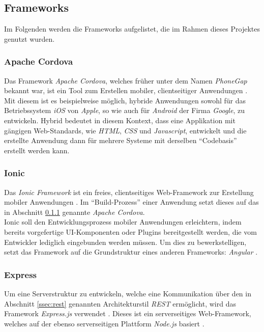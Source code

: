 \documentclass[a4paper, 11pt, DIV=11, listof=numbered, numbers=noenddot]{scrartcl}
\begin{document}
	\subsection{Frameworks}
	Im Folgenden werden die Frameworks aufgelistet, die im Rahmen dieses Projektes genutzt wurden.

	\subsubsection{Apache Cordova}\label{sssec:cordova}
	Das Framework \textit{Apache Cordova}, welches früher unter dem Namen \textit{PhoneGap} bekannt war, ist ein Tool zum Erstellen mobiler, clientseitiger Anwendungen \cite{@Cordova}.
	Mit diesem ist es beispielweise möglich, hybride Anwendungen sowohl für das Betriebssystem \textit{iOS} von \textit{Apple}, so wie auch für \textit{Android} der Firma \textit{Google}, zu entwickeln.
	Hybrid bedeutet in diesem Kontext, dass eine Applikation mit gängigen Web-Standards, wie \textit{HTML}, \textit{CSS} und \textit{Javascript}, entwickelt und die erstellte Anwendung dann für mehrere Systeme mit derselben \enquote{Codebasis} erstellt werden kann.

	\subsubsection{Ionic}\label{sssec:ionic}
	Das \textit{Ionic Framework} ist ein freies, clientseitiges Web-Framework zur Erstellung mobiler Anwendungen \cite{@Ionic}.
	Im \enquote{Build-Prozess} einer Anwendung setzt dieses auf das in Abschnitt \ref{sssec:cordova} genannte \textit{Apache Cordova}.\\
	Ionic soll den Entwicklungsprozess mobiler Anwendungen erleichtern, indem bereits vorgefertige UI-Komponenten oder Plugins bereitgestellt werden, die vom Entwickler lediglich eingebunden werden müssen.
	Um dies zu bewerkstelligen, setzt das Framework auf die Grundstruktur eines anderen Frameworks: \textit{Angular} \cite{@Angular}.

	\subsubsection{Express}\label{sssec:express}
	Um eine Serverstruktur zu entwickeln, welche eine Kommunikation über den in Abschnitt \ref{ssec:rest} genannten Architekturstil \textit{REST} ermöglicht, wird das Framework \textit{Express.js} verwendet \cite{@Express}.
	Dieses ist ein serverseitiges Web-Framework, welches auf der ebenso serverseitigen Plattform \textit{Node.js} basiert \cite{@Nodejs}.
	
\end{document}
